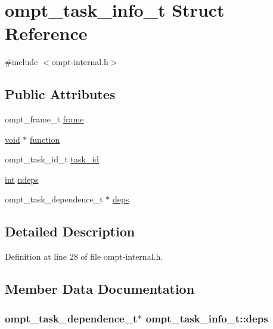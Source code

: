 \hypertarget{structompt__task__info__t}{\section{ompt\-\_\-task\-\_\-info\-\_\-t Struct Reference}
\label{structompt__task__info__t}
}


{\ttfamily \#include $<$ompt-\/internal.\-h$>$}

\subsection*{Public Attributes}
\begin{DoxyCompactItemize}
\item 
ompt\-\_\-frame\-\_\-t \hyperlink{structompt__task__info__t_ab4b3a1c10b649c40015c133ea25fc3ae}{frame}
\item 
\hyperlink{ittnotify__static_8h_af941d56e55e3c5465135b60c4d6343ed}{void} $\ast$ \hyperlink{structompt__task__info__t_ac4cc016e1565bdd8732975f81facfe47}{function}
\item 
ompt\-\_\-task\-\_\-id\-\_\-t \hyperlink{structompt__task__info__t_a9b45ec47bd1086973892108a3a71e6fe}{task\-\_\-id}
\item 
\hyperlink{ittnotify__static_8h_a8b8dcd723308a8cb5d84277c7a3fff70}{int} \hyperlink{structompt__task__info__t_a2d1aa12c03c567b5f34133ef134751b6}{ndeps}
\item 
ompt\-\_\-task\-\_\-dependence\-\_\-t $\ast$ \hyperlink{structompt__task__info__t_acc899972822cd3759f5e4080cd3082b1}{deps}
\end{DoxyCompactItemize}


\subsection{Detailed Description}


Definition at line 28 of file ompt-\/internal.\-h.



\subsection{Member Data Documentation}
\hypertarget{structompt__task__info__t_acc899972822cd3759f5e4080cd3082b1}{
\subsubsection[{deps}]{\setlength{\rightskip}{0pt plus 5cm}ompt\-\_\-task\-\_\-dependence\-\_\-t$\ast$ ompt\-\_\-task\-\_\-info\-\_\-t\-::deps}}\label{structompt__task__info__t_acc899972822cd3759f5e4080cd3082b1}


